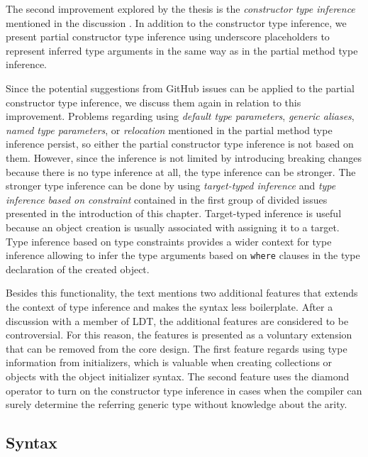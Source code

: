 The second improvement explored by the thesis is the \textit{constructor type inference} mentioned in the discussion \cite{online:CtorTInf}. 
In addition to the constructor type inference, we present partial constructor type inference using underscore placeholders to represent inferred type arguments in the same way as in the partial method type inference.
\par
Since the potential suggestions from GitHub issues can be applied to the partial constructor type inference, we discuss them again in relation to this improvement.
Problems regarding using \textit{default type parameters}, \textit{generic aliases}, \textit{named type parameters}, or \textit{relocation} mentioned in the partial method type inference persist, so either the partial constructor type inference is not based on them.
However, since the inference is not limited by introducing breaking changes because there is no type inference at all, the type inference can be stronger. 
The stronger type inference can be done by using \textit{target-typed inference} and \textit{type inference based on constraint} contained in the first group of divided issues presented in the introduction of this chapter.
Target-typed inference is useful because an object creation is usually associated with assigning it to a target. 
Type inference based on type constraints provides a wider context for type inference allowing to infer the type arguments based on \texttt{where} clauses in the type declaration of the created object. 
\par
Besides this functionality, the text mentions two additional features that extends the context of type inference and makes the syntax less boilerplate.
After a discussion with a member of LDT, the additional features are considered to be controversial. 
For this reason, the features is presented as a voluntary extension that can be removed from the core design. 
The first feature regards using type information from initializers, which is valuable when creating collections or objects with the object initializer syntax. 
The second feature uses the diamond operator to turn on the constructor type inference in cases when the compiler can surely determine the referring generic type without knowledge about the arity.

\subsection{Syntax}


